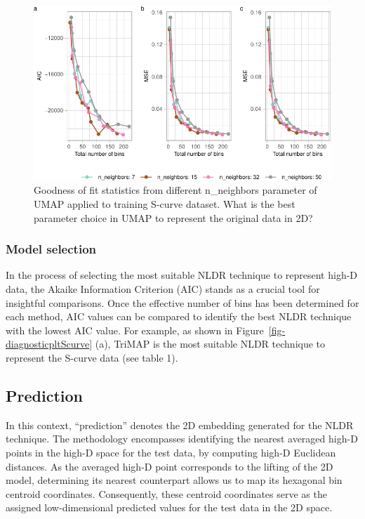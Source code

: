 \documentclass[
  12pt]{article}
\begin{document}
\begin{figure}

{\centering \includegraphics[width=1\textwidth,height=\textheight]{paper_files/figure-pdf/fig-diagnosticpltDiffParam-1.pdf}

}

\caption{\label{fig-diagnosticpltDiffParam}Goodness of fit statistics
from different n\_neighbors parameter of UMAP applied to training
S-curve dataset. What is the best parameter choice in UMAP to represent
the original data in 2D?}

\end{figure}

\hypertarget{sec-selection}{%
\subsubsection{Model selection}\label{sec-selection}}

In the process of selecting the most suitable NLDR technique to
represent high-D data, the Akaike Information Criterion (AIC) stands as
a crucial tool for insightful comparisons. Once the effective number of
bins has been determined for each method, AIC values can be compared to
identify the best NLDR technique with the lowest AIC value. For example,
as shown in Figure~\ref{fig-diagnosticpltScurve} (a), TriMAP is the most
suitable NLDR technique to represent the S-curve data (see table 1).

\hypertarget{sec-prediction}{%
\subsection{Prediction}\label{sec-prediction}}

In this context, ``prediction'' denotes the 2D embedding generated for
the NLDR technique. The methodology encompasses identifying the nearest
averaged high-D points in the high-D space for the test data, by
computing high-D Euclidean distances. As the averaged high-D point
corresponds to the lifting of the 2D model, determining its nearest
counterpart allows us to map its hexagonal bin centroid coordinates.
Consequently, these centroid coordinates serve as the assigned
low-dimensional predicted values for the test data in the 2D space.
\end{document}

